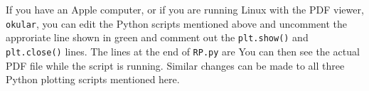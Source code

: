 \documentclass[UserManual.tex]{subfiles}
\begin{document}
\begin{sloppypar}
If you have an Apple computer, or if you are running Linux with the PDF viewer, {\tt okular}, you can edit the Python scripts mentioned above and uncomment the approriate line shown in green and comment out the {\tt plt.show()} and {\tt plt.close()} lines. The lines at the end of {\tt RP.py} are
\vspace*{-8pt}
You can then see the actual PDF file while the script is running. Similar changes can be made to all three Python plotting scripts mentioned here.

\end{sloppypar}
\end{document}
